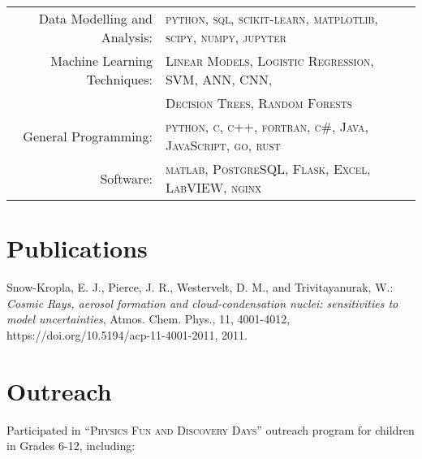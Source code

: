 \documentclass[a4paper,11pt]{article} %
\begin{document}
\begin{tabular}{rl}

Data Modelling and Analysis: & \textsc{python}, \textsc{sql}, \textsc{scikit-learn}, \textsc{matplotlib}, \textsc{scipy}, \textsc{numpy}, \textsc{jupyter} \\

Machine Learning Techniques: & \textsc{Linear Models}, \textsc{Logistic Regression}, \textsc{SVM}, \textsc{ANN}, \textsc{CNN}, \\
& \textsc{Decision Trees}, \textsc{Random Forests} \\

General Programming: & \textsc{python}, \textsc{c}, \textsc{c++}, \textsc{fortran}, \textsc{c\#}, \textsc{Java}, \textsc{JavaScript}, \textsc{go}, \textsc{rust} \\

Software: & \textsc{matlab}, \textsc{PostgreSQL}, \textsc{Flask}, \textsc{Excel}, \textsc{LabVIEW}, \textsc{nginx} \\
\end{tabular}


\section{Publications}
Snow-Kropla, E. J., Pierce, J. R., Westervelt, D. M., and Trivitayanurak, W.: \emph{Cosmic Rays, aerosol formation and cloud-condensation nuclei: sensitivities to model uncertainties}, Atmos. Chem. Phys., 11, 4001-4012, https://doi.org/10.5194/acp-11-4001-2011, 2011.


\section{Outreach}
Participated in \textsc{``Physics Fun and Discovery Days''} outreach program for children in Grades 6-12, including:\\
\end{document}
